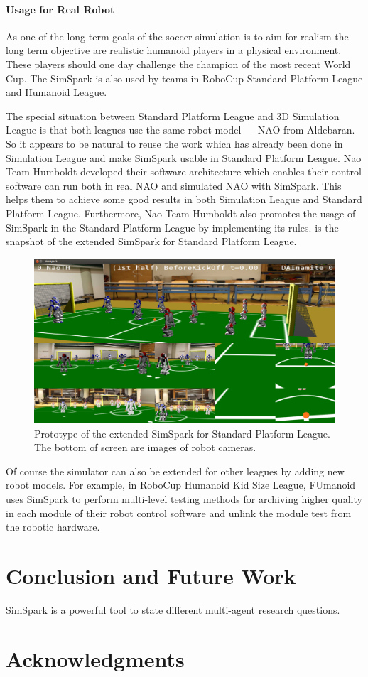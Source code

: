 \documentclass{llncs}
\begin{document}
\paragraph{Usage for Real Robot}
As one of the long term goals of the soccer simulation is to aim for realism the long term objective are realistic humanoid players in a physical environment.
These players should one day challenge the champion of the most recent World Cup.
The SimSpark is also used by teams in RoboCup Standard Platform League and Humanoid League.

The special situation between Standard Platform League and 3D Simulation League is that both leagues use the same robot model — NAO from Aldebaran.
So it appears to be natural to reuse the work which has already been done in Simulation League and make SimSpark usable in Standard Platform League.
Nao Team Humboldt developed their software architecture\cite{SCPR2010} which enables their control software can run both in real NAO and simulated NAO with SimSpark. This helps them to achieve some good results in both Simulation League and Standard Platform League.
Furthermore, Nao Team Humboldt also promotes the usage of SimSpark in the Standard Platform League by implementing its rules.  is the snapshot of the extended SimSpark for Standard Platform League.

\begin{figure}
  \centering
  \includegraphics[width = 0.75\columnwidth]{simspark-spl}
  \caption{Prototype of the extended SimSpark for Standard Platform League.
    The bottom of screen are images of robot cameras.}
  \label{f:simspark-spl}
\end{figure}

Of course the simulator can also be extended for other leagues by adding new robot models.
For example, in RoboCup Humanoid Kid Size League, FUmanoid\cite{Donat2012} uses
SimSpark to perform multi-level testing methods for archiving higher
quality in each module of their robot control software and unlink the
module test from the robotic hardware.


\section{Conclusion and Future Work}
\label{s:conclusion}
SimSpark is a powerful tool to state different multi-agent research questions.


\section*{Acknowledgments}



\end{document}

